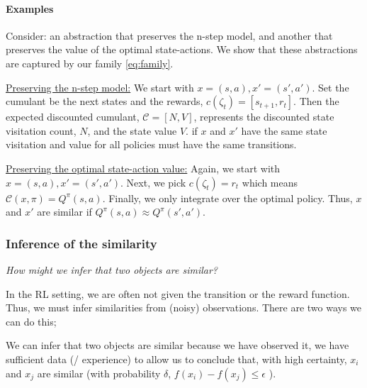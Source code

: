 \paragraph{Examples}

Consider: an abstraction that preserves the n-step model,
and another that preserves the value of the optimal state-actions.
We show that these abstractions are captured by our family \ref{eq:family}.

\underline{Preserving the n-step model:} We start with $x=(s, a), x'=(s', a')$. Set the cumulant be the next states and the rewards, $c(\zeta_{t}) = [s_{t+1}, r_{t}]$. Then the expected discounted cumulant, $\mathcal C=[N, V]$, represents the discounted state visitation count, $N$, and the state value $V$. if $x$ and $x'$ have the same state visitation and value for all policies must have the same transitions\footnotemark.

\vspace{5mm}
\underline{Preserving the optimal state-action value:} Again, we start with $x=(s, a), x'=(s', a')$. Next, we pick $c(\zeta_{t}) = r_{t}$ which means $\mathcal C(x, \pi) = Q^{\pi}(s, a)$. Finally, we only integrate over the optimal policy. Thus, $x$ and $x'$ are similar if $Q^{\pi}(s, a) \approx Q^{\pi}(s', a')$.


\subsubsection{Inference of the similarity}\label{infer-similarity}

\begin{displayquote}
	\textsl{How might we infer that two objects are similar?}
\end{displayquote}


In the RL setting, we are often not given the transition or the reward function.
Thus, we must infer similarities from (noisy) observations. There are two ways we can do this;

\hspace{\parindent}We can infer that two objects are similar because we have observed it,
we have sufficient data (/ experience) to allow us to conclude that, with high
certainty, $x_i$ and $x_j$ are similar (with probability $\delta$, $f(x_i) - f(x_j) \le \epsilon$ ).

